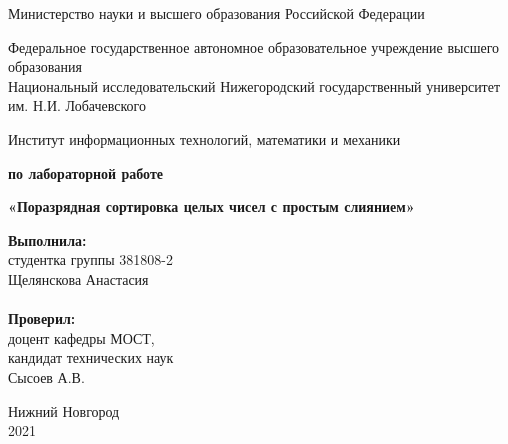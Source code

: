 \documentclass{report}
\begin{document}
\begin{titlepage}

\begin{center}
Министерство науки и высшего образования Российской Федерации
\end{center}

\begin{center}
Федеральное государственное автономное образовательное учреждение высшего образования \\
Национальный исследовательский Нижегородский государственный университет им. Н.И. Лобачевского
\end{center}

\begin{center}
Институт информационных технологий, математики и механики
\end{center}

\vspace{4em}

\begin{center}
\textbf{ по лабораторной работе} \\
\end{center}
\begin{center}
\textbf{\Large«Поразрядная сортировка целых чисел с простым слиянием»} \\
\end{center}

\vspace{4em}

\newbox{\lbox}
\newlength{\maxl}
\setlength{\maxl}{\wd\lbox}
\hfill\parbox{7cm}{
\hspace*{5cm}\hspace*{-5cm}\textbf{Выполнила:} \\ студентка группы 381808-2 \\ Щелянскова Анастасия\\
\\
\hspace*{5cm}\hspace*{-5cm}\textbf{Проверил:}\\ доцент кафедры МОСТ, \\ кандидат технических наук \\ Сысоев А.В.\\
}
\vspace{\fill}

\begin{center} Нижний Новгород \\ 2021 \end{center}

\end{titlepage}
\end{document}
